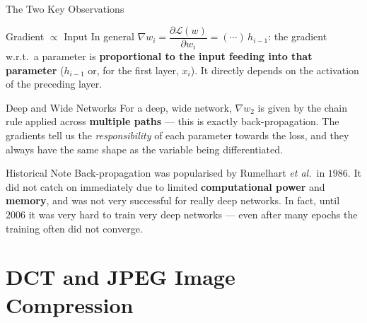 \documentclass{beamer}
\begin{document}
\begin{frame}[shrink=10]{The Two Key Observations}
  \begin{block}{Gradient $\propto$ Input}
    In general $\nabla w_i = \dfrac{\partial \mathcal L(w)}{\partial w_i}
    = (\cdots)\,h_{i-1}$: the gradient w.r.t.\ a parameter is
    \textbf{proportional to the input feeding into that parameter}
    ($h_{i-1}$ or, for the first layer, $x_i$). It directly depends on the
    activation of the preceding layer.
  \end{block}

  \begin{block}{Deep and Wide Networks}
    For a deep, wide network, $\nabla w_2$ is given by the chain rule
    applied across \textbf{multiple paths} --- this is exactly
    back-propagation. The gradients tell us the \emph{responsibility} of
    each parameter towards the loss, and they always have the same shape as
    the variable being differentiated.
  \end{block}

  \begin{exampleblock}{Historical Note}
    Back-propagation was popularised by Rumelhart \emph{et al.}\ in $1986$.
    It did not catch on immediately due to limited \textbf{computational
    power} and \textbf{memory}, and was not very successful for really deep
    networks. In fact, until $2006$ it was very hard to train very deep
    networks --- even after many epochs the training often did not converge.
  \end{exampleblock}
\end{frame}

\section{DCT and JPEG Image Compression}
\end{document}
